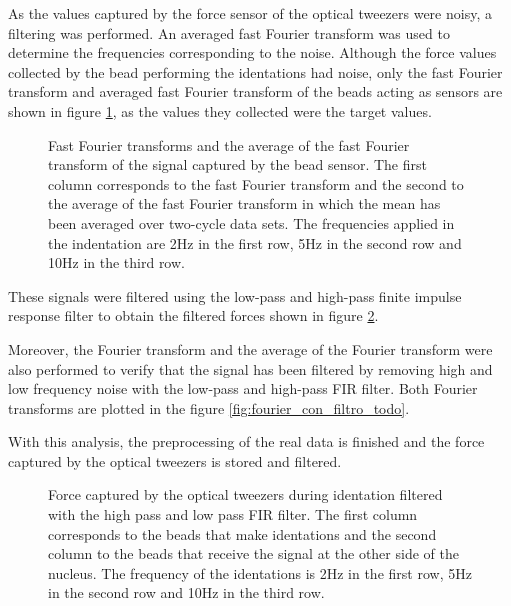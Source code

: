 \documentclass[12pt, a4paper]{article} %
\begin{document}
\newpage

As the values captured by the force sensor of the optical tweezers were noisy, a filtering was performed. An averaged fast Fourier transform was used to determine the frequencies corresponding to the noise. Although the force values collected by the bead performing the identations had noise, only the fast Fourier transform and averaged fast Fourier transform of the beads acting as sensors are shown in figure \ref{fig:fourier_sin_filtro}, as the values they collected were the target values. 

\begin{figure}[htbp]
  \centering
  
  \caption{Fast Fourier transforms and the average of the fast Fourier transform of the signal captured by the bead sensor. The first column corresponds to the fast Fourier transform and the second to the average of the fast Fourier transform in which the mean has been averaged over two-cycle data sets. The frequencies applied in the indentation are 2Hz in the first row, 5Hz in the second row and 10Hz in the third row.}
  \label{fig:fourier_sin_filtro}
\end{figure}

These signals were filtered using the low-pass and high-pass finite impulse response filter to obtain the filtered forces shown in figure \ref{fig:filtered_data}.

Moreover, the Fourier transform and the average of the Fourier transform were also performed to verify that the signal has been filtered by removing high and low frequency noise with the low-pass and high-pass FIR filter. Both Fourier transforms are plotted in the figure \ref{fig:fourier_con_filtro_todo}.

With this analysis, the preprocessing of the real data is finished and the force captured by the optical tweezers is stored and filtered.

\newpage

\begin{figure}[htbp]
  \centering
  
  \caption{Force captured by the optical tweezers during identation filtered with the high pass and low pass FIR filter. The first column corresponds to the beads that make identations and the second column to the beads that receive the signal at the other side of the nucleus. The frequency of the identations is 2Hz in the first row, 5Hz in the second row and 10Hz in the third row.}
  \label{fig:filtered_data}
\end{figure}
\end{document}
